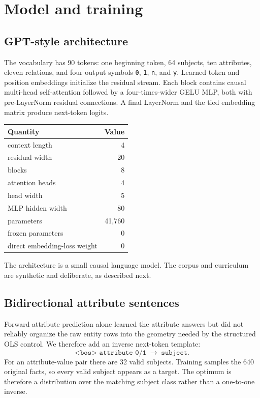 \documentclass[11pt]{article}
\begin{document}
\section{Model and training}

\subsection{GPT-style architecture}

The vocabulary has 90 tokens: one beginning token, 64 subjects, ten
attributes, eleven relations, and four output symbols
\texttt{0}, \texttt{1}, \texttt{n}, and \texttt{y}.  Learned token and position
embeddings initialize the residual stream.  Each block contains causal
multi-head self-attention followed by a four-times-wider GELU MLP, both with
pre-LayerNorm residual connections.  A final LayerNorm and the tied embedding
matrix produce next-token logits.

\begin{center}
\begin{tabular}{lr}
\toprule
Quantity & Value\\
\midrule
context length & 4\\
residual width & 20\\
blocks & 8\\
attention heads & 4\\
head width & 5\\
MLP hidden width & 80\\
parameters & 41,760\\
frozen parameters & 0\\
direct embedding-loss weight & 0\\
\bottomrule
\end{tabular}
\end{center}

The architecture is a small causal language model.  The corpus and curriculum
are synthetic and deliberate, as described next.

\subsection{Bidirectional attribute sentences}

Forward attribute prediction alone learned the attribute answers but did not
reliably organize the raw entity rows into the geometry needed by the
structured OLS control.  We therefore add an inverse next-token template:
\[
  \texttt{<bos> attribute 0/1} \;\longrightarrow\; \texttt{subject}.
\]
For an attribute-value pair there are 32 valid subjects.  Training samples the
640 original facts, so every valid subject appears as a target.  The optimum is
therefore a distribution over the matching subject class rather than a
one-to-one inverse.
\end{document}
